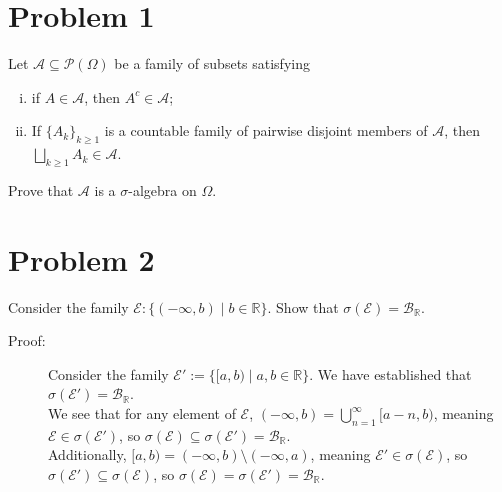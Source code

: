 \documentclass[10pt]{extarticle}
\title{}
\author{}
\date{}
\newcommand{\R}{\mathbb{R}}
\begin{document}
  \section{Problem 1}%
  Let $\mathcal{A}\subseteq \mathcal{P}(\Omega)$ be a family of subsets satisfying
  \begin{enumerate}[(i)]
    \item if $A\in \mathcal{A}$, then $A^{c}\in \mathcal{A}$;
    \item If $\{A_k\}_{k\geq 1}$ is a countable family of pairwise disjoint members of $\mathcal{A}$, then $\bigsqcup_{k\geq 1}A_k \in \mathcal{A}$.
  \end{enumerate}
  Prove that $\mathcal{A}$ is a $\sigma$-algebra on $\Omega$.
  \section{Problem 2}%
  Consider the family $\mathcal{E}: \{(-\infty,b)\mid b\in\R\}$. Show that $\sigma(\mathcal{E}) = \mathcal{B}_{\R}$.
  \begin{description}
    \item[Proof:] Consider the family $\mathcal{E}' := \{[a,b)\mid a,b\in\R\}$. We have established that $\sigma(\mathcal{E}') = \mathcal{B}_{\R}$.\\

      We see that for any element of $\mathcal{E}$, $(-\infty,b) = \bigcup_{n=1}^{\infty}[a-n,b)$, meaning $\mathcal{E}\in \sigma(\mathcal{E}')$, so $\sigma\left(\mathcal{E}\right)\subseteq \sigma(\mathcal{E}') = \mathcal{B}_{\R}$.\\

      Additionally, $[a,b) = (-\infty,b)\setminus (-\infty,a)$, meaning $\mathcal{E}' \in \sigma(\mathcal{E})$, so $\sigma(\mathcal{E}')\subseteq \sigma(\mathcal{E})$, so $\sigma\left(\mathcal{E}\right) = \sigma(\mathcal{E}') = \mathcal{B}_{\R}$.
  \end{description}
\end{document}
